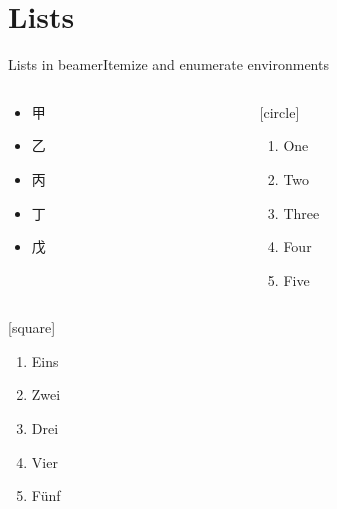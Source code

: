 \documentclass[x11names,aspectratio=32]{beamer}
\begin{document}
\section{Lists}
\begin{frame}{Lists in beamer}{Itemize and enumerate environments}
    \begin{columns}
        \begin{column}{4cm}
            
            \begin{itemize}
                \item 甲
                \item 乙
                \item 丙
                \item 丁
                \item 戊
            \end{itemize}
        \end{column}

        \begin{column}{.4\textwidth}
            

            [circle]
            \begin{enumerate}
                \item One
                \item Two
                \item Three
                \item Four
                \item Five
            \end{enumerate}
        \end{column}
    \end{columns}

    \vfill{}

    \begin{columns}

        \begin{column}{.4\textwidth}
            [square]
            \begin{enumerate}
                \item Eins
                \item Zwei
                \item Drei
                \item Vier
                \item F\"unf
            \end{enumerate}
        \end{column}


\end{columns}
\end{frame}
\end{document}
